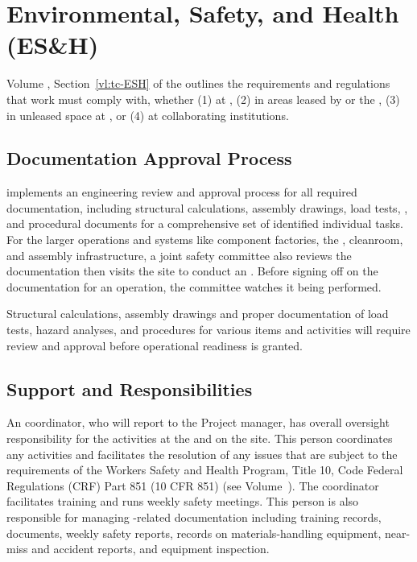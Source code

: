 \section{Environmental, Safety, and Health (ES\&H)}
\label{sec:fdsp-tc-safety}

 Volume \volnumbertc{}, Section~\ref{vl:tc-ESH} of the   outlines the requirements and regulations that  work must comply with, whether (1) at , (2) in areas  leased by  or the , (3) in unleased space at , or (4) at collaborating institutions.
 
\subsection{Documentation Approval Process}


 implements an engineering review and approval process for all required documentation, including structural calculations, assembly drawings, load tests, , and procedural documents for a comprehensive set of identified individual tasks.  For the larger operations and systems like  component factories, the , cleanroom, and assembly infrastructure, a joint safety committee also reviews the documentation then visits the site to conduct
 an . Before signing off on the documentation for an operation, the committee watches it being performed. 
 
 Structural calculations, assembly drawings and proper documentation of  load tests, hazard analyses, and procedures for various items and activities will require review and approval before operational readiness is granted. 

 
\subsection{Support and Responsibilities}

An  coordinator, who will report to the  Project  manager, has overall  oversight responsibility for the  activities at the   and on the  site. 
This person coordinates any  activities and facilitates the resolution of any issues that are subject to the requirements of the  Workers Safety and Health Program, Title 10, Code Federal Regulations (CRF) Part 851 (10 CFR 851) (see Volume~\volnumbertc{}).  The  coordinator facilitates training and runs weekly safety meetings. This person is also responsible for managing -related  documentation including training records,  documents, weekly safety reports, records on materials-handling equipment, near-miss and accident reports, and equipment inspection.


